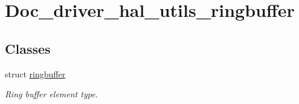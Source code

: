 \hypertarget{group__doc__driver__hal__utils__ringbuffer}{}\section{Doc\+\_\+driver\+\_\+hal\+\_\+utils\+\_\+ringbuffer}
\label{group__doc__driver__hal__utils__ringbuffer}
\subsection*{Classes}
\begin{DoxyCompactItemize}
\item 
struct \hyperlink{structringbuffer}{ringbuffer}
\begin{DoxyCompactList}\small\item\em Ring buffer element type. \end{DoxyCompactList}\end{DoxyCompactItemize}
